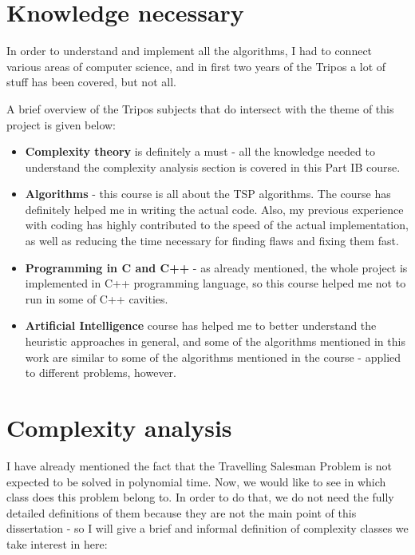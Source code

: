 \documentclass[12pt,twoside,notitlepage]{report}
\begin{document}
\section{Knowledge necessary}

In order to understand and implement all the algorithms, I had to connect various areas of computer science, and in first two years of the Tripos a lot of stuff has been covered, but not all.

A brief overview of the Tripos subjects that do intersect with the theme of this project is given below:

\begin{itemize}

\item {\bf Complexity theory} is definitely a must - all the knowledge needed to understand the complexity analysis section is covered in this Part IB course. 

\item {\bf Algorithms} - this course is all about the TSP algorithms. The course has definitely helped me in writing the actual code. Also, my previous experience with coding has highly contributed to the speed of the actual implementation, as well as reducing the time necessary for finding flaws and fixing them fast.

\item {\bf Programming in C and C++} - as already mentioned, the whole project is implemented in C++ programming language, so this course helped me not to run in some of C++ cavities.

\item {\bf Artificial Intelligence} course has helped me to better understand the heuristic approaches in general, and some of the algorithms mentioned in this work are similar to some of the algorithms mentioned in the course - applied to different problems, however.

\end{itemize}

\section{Complexity analysis}

I have already mentioned the fact that the Travelling Salesman Problem is not expected to be solved in polynomial time. Now, we would like to see in which class does this problem belong to. In order to do that, we do not need the fully detailed definitions of them because they are not the main point of this dissertation - so I will give a brief and informal definition of complexity classes we take interest in here:
\end{document}
